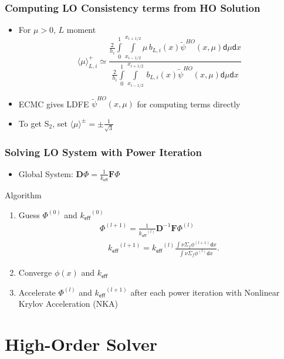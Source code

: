 \documentclass[xcolor=dvipsnames,handout]{beamer}
\newcommand{\keff}[0]{\ensuremath{{k}_{\textsf{eff}}} }
\newcommand{\colb}[1]{{\color{blue} #1}}
\newlength{\wideitemsep}
\let\olditem\item
\renewcommand{\item}{\setlength{\itemsep}{\wideitemsep}\olditem}
\newcommand{\B}[1]{\ensuremath{\mathbf{#1}}}
\renewcommand{\d}{\mathsf{d}}
\newcommand{\mom}[1]{\langle #1 \rangle}
\newcommand{\xl}{{x_{i-1/2}}}
\newcommand{\xr}{{x_{i+1/2}}}
\begin{document}
\begin{frame}
    \frametitle{Computing LO Consistency terms from HO Solution}
    \begin{itemize}
        \item For $\mu>0$, $L$ moment
    \begin{equation}
\mom{{\mu}}_{L,i}^{+} \simeq \frac{\displaystyle 
\frac{2}{h_i} \int\limits_0^1 \int\limits_\xl^\xr \mu \, b_{L,i}(x) \tilde \psi^{HO}(x,\mu) \d \mu \d x } 
{\displaystyle \frac{2}{h_i} \int\limits_0^1 \int\limits_\xl^\xr \, b_{L,i}(x)
\tilde \psi^{HO}(x,\mu) \d \mu \d x } 
    \end{equation}
        \item ECMC gives LDFE $\tilde  \psi^{HO}(x,\mu)$ for computing terms directly
        \item To get S$_2$, set $\mom{\mu}^\pm = \pm \frac{1}{\sqrt{3}}$ 
    \end{itemize}

\end{frame}

\begin{frame}
    \frametitle{Solving LO System with Power Iteration}
    \begin{itemize}
        \item Global System: \hspace{0.8in}${\displaystyle \B D \Phi = \frac{1}{\keff} \B F \Phi}$
     \end{itemize}
     \begin{block}{Algorithm}
         \begin{enumerate}
        \item Guess $\Phi^{(0)}$ and $\keff^{(0)}$
        \begin{align*}
    \Phi^{(l+1)} = \frac{1}{\keff^{(l)}} \B D^{-1} \B F \Phi^{(l)} \\
    \quad \keff^{(l+1)} = \keff^{(l)}\frac{ \int \nu \Sigma_f \phi^{(l+1)} \d
    x}{ \int \nu \Sigma_f \phi^{(l)}\d x }.
        \end{align*}
    \item Converge $\phi(x)$ and \keff \pause
    \item \colb{Accelerate} $\Phi^{(l)}$ and $\keff^{(l+1)}$ after each power iteration
        with Nonlinear Krylov Acceleration (NKA)
     \end{enumerate}
    \end{block}
\end{frame}

\section{High-Order Solver}
\end{document}
